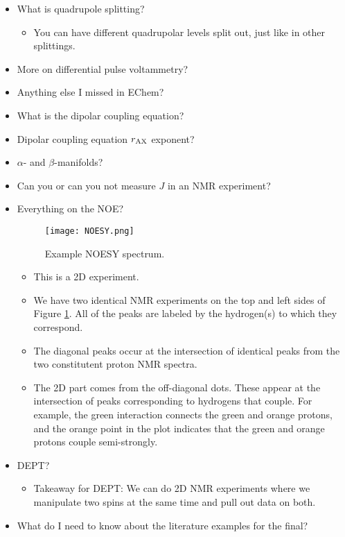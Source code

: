 \documentclass[../notes.tex]{subfiles}
\begin{document}
\begin{itemize}
    \item What is quadrupole splitting?
    \begin{itemize}
        \item You can have different quadrupolar levels split out, just like in other splittings.
    \end{itemize}
    \item More on differential pulse voltammetry?
    \item Anything else I missed in EChem?
    \item What is the dipolar coupling equation?
    \item Dipolar coupling equation $r_{\ce{AX}}$ exponent?
    \item $\alpha$- and $\beta$-manifolds?
    \item Can you or can you not measure $J$ in an NMR experiment?
    \item Everything on the NOE?
    \begin{figure}[H]
        \centering
        \texttt{[image: NOESY.png]}
        \caption{Example NOESY spectrum.}
        \label{fig:NOESY}
    \end{figure}
    \begin{itemize}
        \item This is a 2D experiment.
        \item We have two identical  NMR experiments on the top and left sides of Figure \ref{fig:NOESY}. All of the peaks are labeled by the hydrogen(s) to which they correspond.
        \item The diagonal peaks occur at the intersection of identical peaks from the two constitutent proton NMR spectra.
        \item The 2D part comes from the off-diagonal dots. These appear at the intersection of peaks corresponding to hydrogens that couple. For example, the green interaction connects the green and orange protons, and the orange point in the plot indicates that the green and orange protons couple semi-strongly.
    \end{itemize}
    \item DEPT?
    \begin{itemize}
        \item Takeaway for DEPT: We can do 2D NMR experiments where we manipulate two spins at the same time and pull out data on both.
    \end{itemize}
    \item What do I need to know about the literature examples for the final?

\end{itemize}
\end{document}
